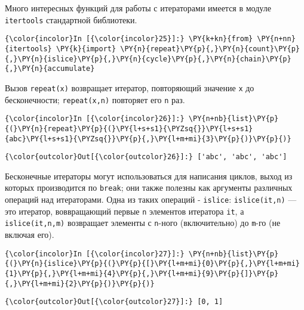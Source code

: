     Много интересных функций для работы с итераторами имеется в модуле
\texttt{itertools} стандартной библиотеки.

    \begin{Verbatim}[commandchars=\\\{\}]
{\color{incolor}In [{\color{incolor}25}]:} \PY{k+kn}{from} \PY{n+nn}{itertools} \PY{k}{import} \PY{n}{repeat}\PY{p}{,}\PY{n}{count}\PY{p}{,}\PY{n}{islice}\PY{p}{,}\PY{n}{cycle}\PY{p}{,}\PY{n}{chain}\PY{p}{,}\PY{n}{accumulate}
\end{Verbatim}


    Вызов \texttt{repeat(x)} возвращает итератор, повторяющий значение
\texttt{x} до бесконечности; \texttt{repeat(x,n)} повторяет его
\texttt{n} раз.

    \begin{Verbatim}[commandchars=\\\{\}]
{\color{incolor}In [{\color{incolor}26}]:} \PY{n+nb}{list}\PY{p}{(}\PY{n}{repeat}\PY{p}{(}\PY{l+s+s1}{\PYZsq{}}\PY{l+s+s1}{abc}\PY{l+s+s1}{\PYZsq{}}\PY{p}{,}\PY{l+m+mi}{3}\PY{p}{)}\PY{p}{)}
\end{Verbatim}


\begin{Verbatim}[commandchars=\\\{\}]
{\color{outcolor}Out[{\color{outcolor}26}]:} ['abc', 'abc', 'abc']
\end{Verbatim}
            
    Бесконечные итераторы могут использоваться для написания циклов, выход
из которых производится по \texttt{break}; они также полезны как
аргументы различных операций над итераторами. Одна из таких операций -
\texttt{islice}: \texttt{islice(it,n)} --- это итератор, воввращающий
первые \texttt{n} элементов итератора \texttt{it}, а
\texttt{islice(it,n,m)} возвращает элементы с \texttt{n}-ного
(включительно) до \texttt{m}-го (не включая его).

    \begin{Verbatim}[commandchars=\\\{\}]
{\color{incolor}In [{\color{incolor}27}]:} \PY{n+nb}{list}\PY{p}{(}\PY{n}{islice}\PY{p}{(}\PY{p}{[}\PY{l+m+mi}{0}\PY{p}{,}\PY{l+m+mi}{1}\PY{p}{,}\PY{l+m+mi}{4}\PY{p}{,}\PY{l+m+mi}{9}\PY{p}{]}\PY{p}{,}\PY{l+m+mi}{2}\PY{p}{)}\PY{p}{)}
\end{Verbatim}


\begin{Verbatim}[commandchars=\\\{\}]
{\color{outcolor}Out[{\color{outcolor}27}]:} [0, 1]
\end{Verbatim}
            
